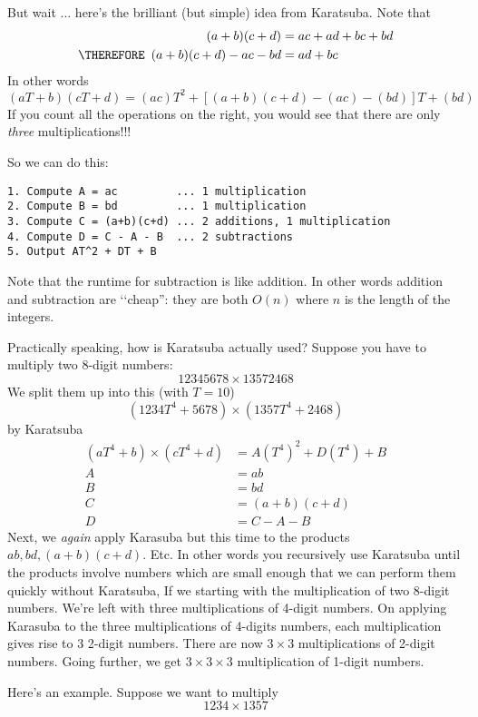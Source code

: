 But wait ... here's the brilliant (but simple) idea from Karatsuba.
Note that 
\begin{align*}
            (a+b)(c+d) &= ac + ad + bc + bd \\
\THEREFORE\,\,\,  (a+b)(c+d) - ac - bd &= ad + bc
\end{align*}
In other words
\[
(aT + b)(cT + d) = (ac)T^2 + [(a+b)(c+d) - (ac) - (bd)]T + (bd)
\]
If you count all the operations on the right,
you would see that there are only
\textit{ three} multiplications!!!

So we can do this:
\begin{Verbatim}[frame=single]
1. Compute A = ac         ... 1 multiplication
2. Compute B = bd         ... 1 multiplication
3. Compute C = (a+b)(c+d) ... 2 additions, 1 multiplication
4. Compute D = C - A - B  ... 2 subtractions
5. Output AT^2 + DT + B
\end{Verbatim}

Note that the runtime for subtraction is like addition.
In other words addition and subtraction are \lq\lq cheap'':
they are both $O(n)$ where $n$ is the length of the integers.

Practically speaking, how is Karatsuba actually used? 
Suppose you have to multiply two 8-digit numbers:
\[
12345678 \times 13572468
\]
We split them up into this (with $T = 10$)
\[
(1234T^4 + 5678) \times (1357T^4 + 2468)
\]
by Karatsuba
\begin{align*}
(a T^4 + b) \times (c T^4 + d) &= A (T^4)^2 + D (T^4) + B \\
A &= a b \\
B &= b d \\
C &= (a + b)(c + d) \\
D &= C - A - B
\end{align*}
Next, we
\textit{ again} apply Karasuba but this time to the products
$a b, b d, (a + b)(c + d)$.
Etc. 
In other words you recursively use Karatsuba
until the products involve numbers which are small enough
that we can perform them quickly without Karatsuba,
If we starting with the multiplication of two 8-digit numbers.
We're left with three multiplications of 4-digit numbers.
On applying Karasuba to the three multiplications of 4-digits numbers,
each multiplication gives rise to 3 2-digit numbers.
There are now $3 \times 3$ multiplications of 2-digit
numbers.
Going further, we get $3 \times 3 \times 3$ multiplication of 1-digit
numbers.

Here's an example.
Suppose we want to multiply
\[
1234 \times 1357
\]

